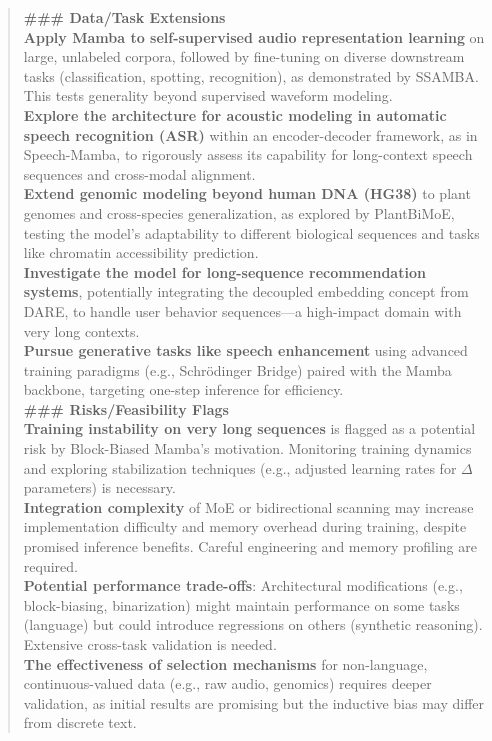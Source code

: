 \begin{quote}
\begin{tcolorbox}[breakable,colback=almond!20!white, colframe=almond!60!black, title=\textbf{Case Study (Mamba: Linear-Time Sequence Modeling with Selective State Spaces)}]
        \textbf{\#\#\# Data/Task Extensions}\\
        \textbf{Apply Mamba to self-supervised audio representation learning} on large, unlabeled corpora, followed by fine-tuning on diverse downstream tasks (classification, spotting, recognition), as demonstrated by SSAMBA. This tests generality beyond supervised waveform modeling.\\
        \textbf{Explore the architecture for acoustic modeling in automatic speech recognition (ASR)} within an encoder-decoder framework, as in Speech-Mamba, to rigorously assess its capability for long-context speech sequences and cross-modal alignment.\\
        \textbf{Extend genomic modeling beyond human DNA (HG38)} to plant genomes and cross-species generalization, as explored by PlantBiMoE, testing the model's adaptability to different biological sequences and tasks like chromatin accessibility prediction.\\
        \textbf{Investigate the model for long-sequence recommendation systems}, potentially integrating the decoupled embedding concept from DARE, to handle user behavior sequences—a high-impact domain with very long contexts.\\
        \textbf{Pursue generative tasks like speech enhancement} using advanced training paradigms (e.g., Schrödinger Bridge) paired with the Mamba backbone, targeting one-step inference for efficiency.\\

        \textbf{\#\#\# Risks/Feasibility Flags}\\
        \textbf{Training instability on very long sequences} is flagged as a potential risk by Block-Biased Mamba's motivation. Monitoring training dynamics and exploring stabilization techniques (e.g., adjusted learning rates for $\Delta$ parameters) is necessary.\\
        \textbf{Integration complexity} of MoE or bidirectional scanning may increase implementation difficulty and memory overhead during training, despite promised inference benefits. Careful engineering and memory profiling are required.\\
        \textbf{Potential performance trade-offs}: Architectural modifications (e.g., block-biasing, binarization) might maintain performance on some tasks (language) but could introduce regressions on others (synthetic reasoning). Extensive cross-task validation is needed.\\
        \textbf{The effectiveness of selection mechanisms} for non-language, continuous-valued data (e.g., raw audio, genomics) requires deeper validation, as initial results are promising but the inductive bias may differ from discrete text.\\


\end{tcolorbox}
\end{quote}
